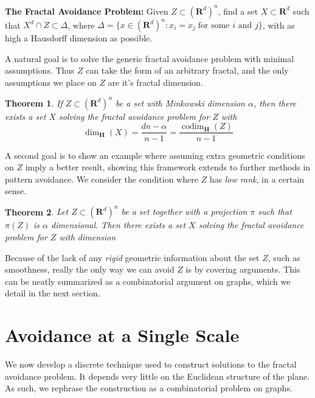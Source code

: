 \documentclass{article}
\theoremstyle{plain}
\theoremstyle{plain}
\newtheorem{theorem}{Theorem}
\DeclareMathOperator{\codim}{codim}
\begin{document}
\begin{multicols}{2}
\begin{changemargin}{0.5em}{0em}
	{\bf The Fractal Avoidance Problem:} Given $Z \subset (\mathbf{R}^d)^n$, find a set $X \subset \mathbf{R}^d$ such that $X^d \cap Z \subset \Delta$, where $\Delta = \{ x \in (\mathbf{R}^d)^n : x_i = x_j\; \text{for some $i$ and $j$} \}$, with as high a Hausdorff dimension as possible.
\end{changemargin}

A natural goal is to solve the generic fractal avoidance problem with minimal assumptions. Thus $Z$ can take the form of an arbitrary fractal, and the only assumptions we place on $Z$ are it's fractal dimension.

\begin{theorem}
	If $Z \subset (\mathbf{R}^d)^n$ be a set with Minkowski dimension $\alpha$, then there exists a set $X$ solving the fractal avoidance problem for $Z$ with
	\[ \dim_{\mathbf{H}}(X) = \frac{dn - \alpha}{n - 1} = \frac{\codim_{\mathbf{H}}(Z)}{n - 1} \]
\end{theorem}


A second goal is to show an example where assuming extra geometric conditions on $Z$ imply a better result, showing this framework extends to further methods in pattern avoidance. We consider the condition where $Z$ has {\it low rank}, in a certain sense.

\begin{theorem}
	Let $Z \subset (\mathbf{R}^d)^n$ be a set together with a projection $\pi$ such that $\pi(Z)$ is $\alpha$ dimensional. Then there exists a set $X$ solving the fractal avoidance problem for $Z$ with dimension
\end{theorem}

Because of the lack of any {\it rigid} geometric information about the set $Z$, such as smoothness, really the only way we can avoid $Z$ is by covering arguments. This can be neatly summarized as a combinatorial argument on graphs, which we detail in the next section.

\section{Avoidance at a Single Scale}

We now develop a discrete technique used to construct solutions to the fractal avoidance problem. It depends very little on the Euclidean structure of the plane. As such, we rephrase the construction as a combinatorial problem on graphs.


\end{multicols}
\end{document}
